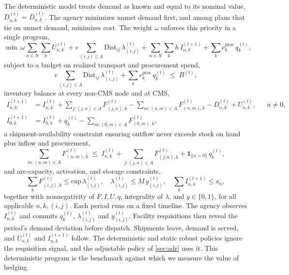 \documentclass[11pt]{article}
\begin{document}
The deterministic model treats demand as known and equal to its nominal value, $D_{n,k}^{(t)} = \bar D_{n,k}^{(t)}$.
The agency minimizes unmet demand first, and among plans that tie on unmet demand, minimizes cost.
The weight $\omega$ enforces this priority in a single program,
\begin{equation}
\min \;
\omega \sum_{n\in N}\sum_{k} U_{n,k}^{(t)}
+ v \sum_{(i,j)\in A} \text{Dist}_{ij}\,\lambda_{(i,j)}^{(t)}
+ \sum_{n\in N}\sum_{k} h\, I^{(t+1)}_{n,k}
+ \sum_{k} c_k^{\text{proc}}\, q_k^{(t)},
\label{eq:baseline_obj}
\end{equation}
subject to a budget on realized transport and procurement spend,
\begin{equation}
v \sum_{(i,j)\in A} \text{Dist}_{ij}\,\lambda_{(i,j)}^{(t)}
+ \sum_{k} c_k^{\text{proc}}\, q_k^{(t)}
\;\le\; B^{(t)},
\label{eq:budget}
\end{equation}
inventory balance at every non-CMS node and at CMS,
\begin{align}
I^{(t+1)}_{n,k} &= I^{(t)}_{n,k}
+ \textstyle\sum_{j:(j,n)\in A} F_{(j,n),k}^{(t)}
- \sum_{m:(n,m)\in A} F_{(n,m),k}^{(t)}
- D_{n,k}^{(t)} + U_{n,k}^{(t)},
&& n \neq 0, \label{eq:balance}\\
I^{(t+1)}_{0,k} &= I^{(t)}_{0,k} + q_k^{(t)}
- \textstyle\sum_{m:(0,m)\in A} F_{(0,m),k}^{(t)},
\label{eq:balance_cms}
\end{align}
a shipment-availability constraint ensuring outflow never exceeds stock on hand plus inflow and procurement,
\begin{equation}
\textstyle\sum_{m:(n,m)\in A} F_{(n,m),k}^{(t)}
\;\le\;
I_{n,k}^{(t)} + \sum_{j:(j,n)\in A} F_{(j,n),k}^{(t)}
+ \mathbf{1}_{\{n=0\}}\, q_k^{(t)},
\label{eq:availability}
\end{equation}
and arc-capacity, activation, and storage constraints,
\begin{equation}
\textstyle\sum_{k} F_{(i,j),k}^{(t)} \le \text{cap}\,\lambda_{(i,j)}^{(t)}, \quad
\lambda_{(i,j)}^{(t)} \le M\, y_{(i,j)}^{(t)}, \quad
\textstyle\sum_{k} I^{(t+1)}_{n,k} \le s_n,
\label{eq:capacity}
\end{equation}
together with nonnegativity of $F, I, U, q$, integrality of $\lambda$, and $y \in \{0,1\}$, for all applicable $n, k, (i,j)$.
Each period runs on a fixed timeline.
The agency observes $I_{n,k}^{(t)}$ and commits $q_k^{(t)}$, $\lambda_{(i,j)}^{(t)}$ and $y_{(i,j)}^{(t)}$.
Facility requisitions then reveal the period's demand deviation before dispatch.
Shipments leave, demand is served, and $U_{n,k}^{(t)}$ and $I_{n,k}^{(t+1)}$ follow.
The deterministic and static robust policies ignore the requisition signal, and the adjustable policy of \Sec\ref{sec:adr} uses it.
This deterministic program is the benchmark against which we measure the value of hedging.
\end{document}
